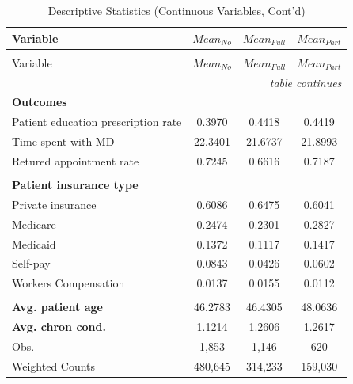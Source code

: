\documentclass[12pt]{report}
\begin{document}
\newpage
{\footnotesize
\begin{center}
\label{tab:desc2}

\begin{longtable}{lccc}
\caption{Descriptive Statistics (Continuous Variables)}\\

\hline \hline
Variable   & $Mean_{No}$ & $Mean_{Full}$ & $Mean_{Part}$ \\ \hline \endfirsthead

\caption*{Descriptive Statistics (Continuous Variables, Cont'd)}\\

\hline \hline
Variable   & $Mean_{No}$ & $Mean_{Full}$ & $Mean_{Part}$ \\ \hline \endhead

\hline  \multicolumn{4}{r}{\textit{table continues}}\\ \endfoot
\hline \hline  \endlastfoot

\textbf{Outcomes}                   &           &             &             \\
Patient education prescription rate & 0.3970    & 0.4418      & 0.4419      \\
Time spent with MD                  & 22.3401   & 21.6737     & 21.8993     \\
Retured appointment rate            & 0.7245    & 0.6616      & 0.7187      \\
                                    &           &             &             \\
\textbf{Patient insurance type}     &           &             &             \\
Private insurance                   & 0.6086    & 0.6475      & 0.6041      \\
Medicare                            & 0.2474    & 0.2301      & 0.2827      \\
Medicaid                            & 0.1372    & 0.1117      & 0.1417      \\
Self-pay                            & 0.0843    & 0.0426      & 0.0602      \\
Workers Compensation                & 0.0137    & 0.0155      & 0.0112      \\
                                    &           &             &             \\
\textbf{Avg. patient age}           & 46.2783   & 46.4305     & 48.0636     \\
\textbf{Avg. chron cond.}           & 1.1214    & 1.2606      & 1.2617      \\ 
Obs.                                & 1,853     & 1,146       & 620         \\
Weighted Counts                     & 480,645   & 314,233     & 159,030     \\
\end{longtable}
\end{center}}
\end{document}
